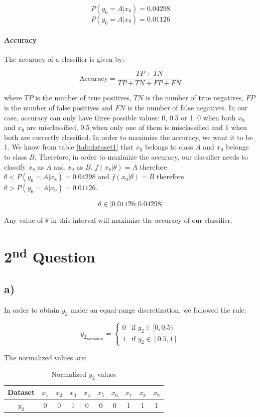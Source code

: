 \documentclass{article}
\begin{document}
\[ P(y_6 = A|x_8) = 0.04298 \]
\[ P(y_6 = A|x_9) = 0.01126 \]

\paragraph{Accuracy}

The accuracy of a classifier is given by:

\[ \text{Accuracy} = \frac{TP + TN}{TP + TN + FP + FN} \]

where $TP$ is the number of true positives, $TN$ is the number of true negatives, $FP$ is the number of false positives and $FN$ is the number of false negatives.
In our case, accuracy can only have three possible values: 0, 0.5 or 1: 0 when both $x_8$ and $x_9$ are misclassified, 0.5 when only one of them is misclassified and 1 when both are correctly classified.
In order to maximize the accuracy, we want it to be 1. We know from table \ref{tab:dataset1} that $x_8$ belongs to class $A$ and $x_9$ belongs to class $B$. Therefore, in order to maximize the accuracy, our classifier needs to classify $x_8$ as $A$ and $x_9$ as $B$.
$f(x_8|\theta) = A$ therefore $\theta < P(y_6=A|x_8) = 0.04298$ and $f(x_9|\theta) = B$ therefore $\theta > P(y_6=A|x_9) = 0.01126$. 

\[ \theta \in ]0.01126; 0.04298[ \]

Any value of $\theta$ in this interval will maximize the accuracy of our classifier.

\newpage

\section*{2\textsuperscript{nd} Question}

\subsection*{a)}

In order to obtain $y_2$ under an equal-range discretization, we followed the rule:

\[ y_{2_{\text{normalized}}} = \begin{cases}
  0 & \text{if } y_2 \in [0, 0.5) \\
  1 & \text{if } y_2 \in [0.5, 1]
\end{cases} \]

The normalized values are:

\begin{table}[H]
\centering
\begin{tabular}{|c|c|c|c|c|c|c|c|c|c|}
  \hline
  Dataset & $x_1$ & $x_2$ & $x_3$ & $x_4$ & $x_5$ & $x_6$ & $x_7$ & $x_8$ & $x_9$ \\ \hline
  $y_2$ & 0 & 0 & 1 & 0 & 0 & 0 & 1 & 1 & 1 \\ \hline
\end{tabular}
\label{tab:dataset2}
\caption{Normalized $y_2$ values}
\end{table}
\end{document}
